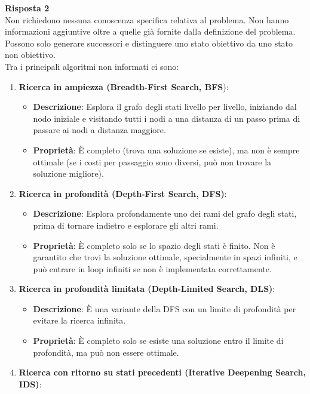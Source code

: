 \documentclass[../main.tex]{subfiles}
\begin{document}
	\textbf{Risposta 2}\\
	Non richiedono nessuna conoscenza specifica relativa al problema.
	Non hanno informazioni aggiuntive oltre a quelle già fornite dalla definizione del problema.\\
	Possono solo generare successori e distinguere uno stato obiettivo da uno stato non obiettivo.\\
	Tra i principali algoritmi non informati ci sono:
	\begin{enumerate}
		\item \textbf{Ricerca in ampiezza (Breadth-First Search, BFS}):
		\begin{itemize}
			\item \textbf{Descrizione}: Esplora il grafo degli stati livello per livello, iniziando dal nodo iniziale e visitando tutti i nodi a una distanza di un passo prima di passare ai nodi a distanza maggiore.
			\item \textbf{Proprietà}: È completo (trova una soluzione se esiste), ma non è sempre ottimale (se i costi per passaggio sono diversi, può non trovare la soluzione migliore).
		\end{itemize}
		\item \textbf{Ricerca in profondità (Depth-First Search, DFS)}:
		\begin{itemize}
			\item \textbf{Descrizione}: Esplora profondamente uno dei rami del grafo degli stati, prima di tornare indietro e esplorare gli altri rami.
			\item \textbf{Proprietà}: È completo solo se lo spazio degli stati è finito. Non è garantito che trovi la soluzione ottimale, specialmente in spazi infiniti, e può entrare in loop infiniti se non è implementata correttamente.
		\end{itemize}
		\item \textbf{Ricerca in profondità limitata (Depth-Limited Search, DLS)}:
		\begin{itemize}
			\item \textbf{Descrizione}: È una variante della DFS con un limite di profondità per evitare la ricerca infinita.
			\item \textbf{Proprietà}: È completo solo se esiste una soluzione entro il limite di profondità, ma può non essere ottimale.
		\end{itemize}
		\item \textbf{Ricerca con ritorno su stati precedenti (Iterative Deepening Search, IDS)}:
		\begin{itemize}

\end{itemize}
\end{enumerate}
\end{document}
